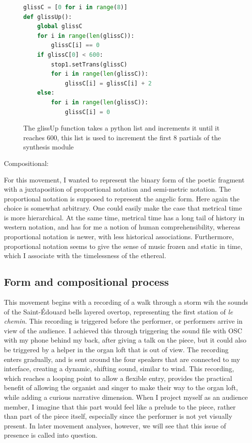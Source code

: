 \documentclass[12pt,twoside,maitrise]{dms_ks}
\theoremstyle{definition}
\begin{document}
\begin{figure}[H]
\begin{lstlisting}[language=Python]
glissC = [0 for i in range(8)]
def glissUp():
    global glissC
    for i in range(len(glissC)):
        glissC[i] == 0
    if glissC[0] < 600:
        stop1.setTrans(glissC)
        for i in range(len(glissC)):
            glissC[i] = glissC[i] + 2
    else:
        for i in range(len(glissC)):
            glissC[i] = 0
\end{lstlisting}
\caption{The glissUp function takes a python list and increments it until it reaches 600, this list is used to increment the first 8 partials of the synthesis module}
\end{figure}

Compositional:

For this movement, I wanted to represent the binary form of the poetic fragment with a juxtaposition of proportional notation and semi-metric notation.
The proportional notation is supposed to represent the angelic form.
Here again the choice is somewhat arbitrary.
One could easily make the case that metrical time is more hierarchical.
At the same time, metrical time has a long tail of history in western notation, and has for me a notion of human comprehensibility, whereas proportional notation is newer, with less historical associations.
Furthermore, proportional notation seems to give the sense of music frozen and static in time, which I associate with the timelessness of the ethereal.

\subsection{Form and compositional process}

This movement begins with a recording of a walk through a storm wih the sounds of the Saint-Édouard bells layered overtop, representing the first station of \textit{le chemin}.
This recording is triggered before the performer, or performers arrive in view of the audience.
I achieved this through triggering the sound file with OSC with my phone behind my back, after giving a talk on the piece, but it could also be triggered by a helper in the organ loft that is out of view.
The recording enters gradually, and is sent around the four speakers that are connected to my interface, creating a dynamic, shifting sound, similar to wind.
This recording, which reaches a looping point to allow a flexible entry, provides the practical benefit of allowing the organist and singer to make their way to the organ loft, while adding a curious narrative dimension.
When I project myself as an audience member, I imagine that this part would feel like a prelude to the piece, rather than part of the piece itself, especially since the performer is not yet visually present.
In later movement analyses, however, we will see that this issue of presence is called into question.
\end{document}

